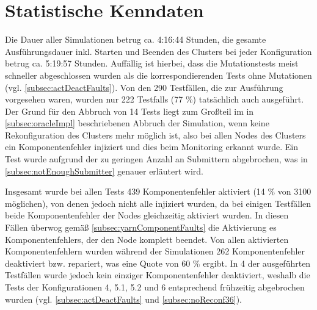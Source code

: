 \section{Statistische Kenndaten}
\label{sec:evaluationStats}

Die Dauer aller Simulationen betrug ca. 4:16:44 Stunden, die gesamte Ausführungsdauer inkl. Starten und Beenden des Clusters bei jeder Konfiguration betrug ca. 5:19:57 Stunden.
Auffällig ist hierbei, dass die Mutationstests meist schneller abgeschlossen wurden als die korrespondierenden Tests ohne Mutationen (vgl. \cref{subsec:actDeactFaults}).
Von den 290 Testfällen, die zur Ausführung vorgesehen waren, wurden nur 222 \glspl{Testfall} (77 \%) tatsächlich auch ausgeführt.
Der Grund für den Abbruch von 14 \glspl{Test} liegt zum Großteil im in \cref{subsec:oracleImpl} beschriebenen Abbruch der Simulation, wenn keine Rekonfiguration des Clusters mehr möglich ist, also bei allen Nodes des Clusters ein Komponentenfehler injiziert und dies beim Monitoring erkannt wurde.
Ein \gls{Test} wurde aufgrund der zu geringen Anzahl an Submittern abgebrochen, was in \cref{subsec:notEnoughSubmitter} genauer erläutert wird.

Insgesamt wurde bei allen \glspl{Test} 439 Komponentenfehler aktiviert (14 \% von 3100 möglichen), von denen jedoch nicht alle injiziert wurden, da bei einigen Testfällen beide Komponentenfehler der Nodes gleichzeitig aktiviert wurden.
In diesen Fällen überwog gemäß \cref{subsec:yarnComponentFaults} die Aktivierung es Komponentenfehlers, der den Node komplett beendet.
Von allen aktivierten Komponentenfehlern wurden während der Simulationen 262 Komponentenfehler deaktiviert bzw. repariert, was eine Quote von 60 \% ergibt.
In 4 der ausgeführten Testfällen wurde jedoch kein einziger Komponentenfehler deaktiviert, weshalb die \glspl{Test} der Konfigurationen 4, 5.1, 5.2 und 6 entsprechend frühzeitig abgebrochen wurden (vgl. \cref{subsec:actDeactFaults} und \cref{subsec:noReconf36}).

